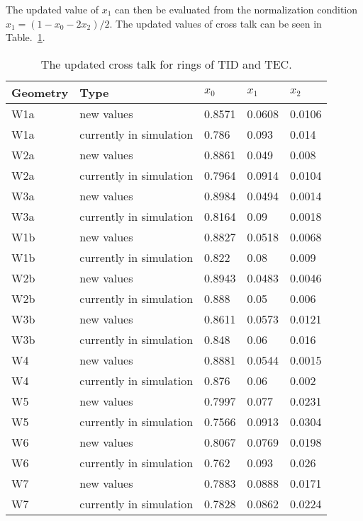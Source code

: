 The updated value of $x_{1}$ can then be evaluated from the normalization condition $x_{1} = (1-x_{0}-2x_{2})/2$. The updated values of cross talk can be seen in Table.~\ref{tab:measuredXtalkTODTEC}.

\begin{table}[h]
\begin{center}
\begin{tabular}{|l|l|l|l|l|}
\hline
Geometry & Type & $x_{0}$ & $x_{1}$ & $x_{2}$ \\
\hline
\hline
W1a &  new values & 0.8571 & 0.0608 & 0.0106 \\
W1a &  currently in simulation & 0.786 & 0.093 & 0.014 \\
\hline
W2a &  new values & 0.8861 & 0.049 & 0.008 \\
W2a &  currently in simulation & 0.7964 & 0.0914 & 0.0104 \\
\hline
W3a &  new values & 0.8984 & 0.0494 & 0.0014 \\
W3a &  currently in simulation & 0.8164 & 0.09 & 0.0018 \\
\hline
W1b &  new values & 0.8827 & 0.0518 & 0.0068 \\
W1b &  currently in simulation & 0.822 & 0.08 & 0.009 \\
\hline
W2b &  new values & 0.8943 & 0.0483 & 0.0046 \\
W2b &  currently in simulation & 0.888 & 0.05 & 0.006 \\
\hline
W3b &  new values & 0.8611 & 0.0573 & 0.0121 \\
W3b &  currently in simulation & 0.848 & 0.06 & 0.016 \\
\hline
W4 &  new values & 0.8881 & 0.0544 & 0.0015 \\
W4 &  currently in simulation & 0.876 & 0.06 & 0.002 \\
\hline
W5 &  new values & 0.7997 & 0.077 & 0.0231 \\
W5 &  currently in simulation & 0.7566 & 0.0913 & 0.0304 \\
\hline
W6 &  new values & 0.8067 & 0.0769 & 0.0198 \\
W6 &  currently in simulation & 0.762 & 0.093 & 0.026 \\
\hline
W7 &  new values & 0.7883 & 0.0888 & 0.0171 \\
W7 &  currently in simulation & 0.7828 & 0.0862 & 0.0224 \\
\hline
\end{tabular}
\caption[Table caption text]{The updated cross talk for rings of TID and TEC. }
\label{tab:measuredXtalkTODTEC}
\end{center}
\end{table}



